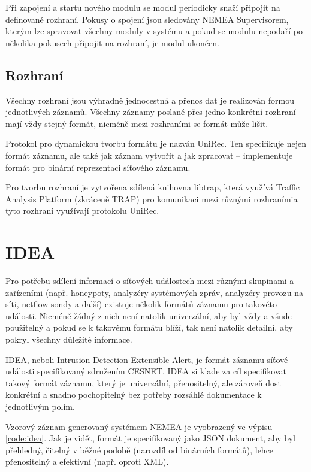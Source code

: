 Při zapojení a startu nového modulu se modul periodicky snaží připojit na definované rozhraní. Pokusy o spojení jsou sledovány NEMEA Supervisorem, kterým lze spravovat všechny moduly v systému a pokud se modulu nepodaří po několika pokusech připojit na rozhraní, je modul ukončen.

\subsection{Rozhraní}

Všechny rozhraní jsou výhradně jednocestná a přenos dat je realizován formou jednotlivých záznamů. Všechny záznamy poslané přes jedno konkrétní rozhraní mají vždy stejný formát, nicméně mezi rozhraními se formát může lišit. 

Protokol pro dynamickou tvorbu formátu je nazván UniRec. Ten specifikuje nejen formát záznamu, ale také jak záznam vytvořit a jak zpracovat -- implementuje formát pro binární reprezentaci síťového záznamu.

Pro tvorbu rozhraní je vytvořena sdílená knihovna libtrap, která využívá Traffic Analysis Platform (zkráceně TRAP) pro komunikaci mezi různými rozhranímia tyto rozhraní využívají protokolu UniRec.

\section{IDEA}
\label{sec:idea}

Pro potřebu sdílení informací o síťových událostech mezi různými skupinami a zařízeními (např. honeypoty, analyzéry systémových zpráv, analyzéry provozu na síti, netflow sondy a další) existuje několik formátů záznamu pro takovéto události. Nicméně žádný z nich není natolik univerzální, aby byl vždy a všude použitelný a pokud se k takovému formátu blíží, tak není natolik detailní, aby pokryl všechny důležité informace.

IDEA, neboli Intrusion Detection Extensible Alert, je formát záznamu síťové události specifikovaný sdružením CESNET. IDEA si klade za cíl specifikovat takový formát záznamu, který je univerzální, přenositelný, ale zároveň dost konkrétní a snadno pochopitelný bez potřeby rozsáhlé dokumentace k jednotlivým polím.

Vzorový záznam generovaný systémem NEMEA je vyobrazený ve výpisu \ref{code:idea}. Jak je vidět, formát je specifikovaný jako JSON dokument, aby byl přehledný, čitelný v běžné podobě (narozdíl od binárních formátů), lehce přenositelný a efektivní (např. oproti XML\cite{xmlvsjson}).

